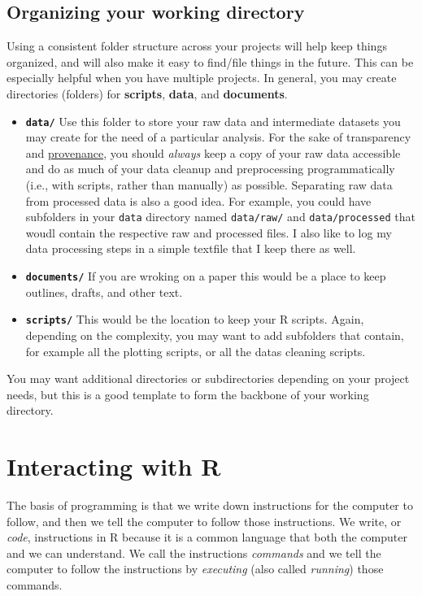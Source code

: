 \documentclass[]{book}
\providecommand{\tightlist}{%
  \setlength{\itemsep}{0pt}\setlength{\parskip}{0pt}}
\begin{document}
\subsection{Organizing your working
directory}\label{organizing-your-working-directory}

Using a consistent folder structure across your projects will help keep
things organized, and will also make it easy to find/file things in the
future. This can be especially helpful when you have multiple projects.
In general, you may create directories (folders) for \textbf{scripts},
\textbf{data}, and \textbf{documents}.

\begin{itemize}
\tightlist
\item
  \textbf{\texttt{data/}} Use this folder to store your raw data and
  intermediate datasets you may create for the need of a particular
  analysis. For the sake of transparency and
  \href{https://en.wikipedia.org/wiki/Provenance}{provenance}, you
  should \emph{always} keep a copy of your raw data accessible and do as
  much of your data cleanup and preprocessing programmatically (i.e.,
  with scripts, rather than manually) as possible. Separating raw data
  from processed data is also a good idea. For example, you could have
  subfolders in your \texttt{data} directory named \texttt{data/raw/}
  and \texttt{data/processed} that woudl contain the respective raw and
  processed files. I also like to log my data processing steps in a
  simple textfile that I keep there as well.
\item
  \textbf{\texttt{documents/}} If you are wroking on a paper this would
  be a place to keep outlines, drafts, and other text.
\item
  \textbf{\texttt{scripts/}} This would be the location to keep your R
  scripts. Again, depending on the complexity, you may want to add
  subfolders that contain, for example all the plotting scripts, or all
  the datas cleaning scripts.
\end{itemize}

You may want additional directories or subdirectories depending on your
project needs, but this is a good template to form the backbone of your
working directory.

\section{Interacting with R}\label{interacting-with-r}

The basis of programming is that we write down instructions for the
computer to follow, and then we tell the computer to follow those
instructions. We write, or \emph{code}, instructions in R because it is
a common language that both the computer and we can understand. We call
the instructions \emph{commands} and we tell the computer to follow the
instructions by \emph{executing} (also called \emph{running}) those
commands.
\end{document}
